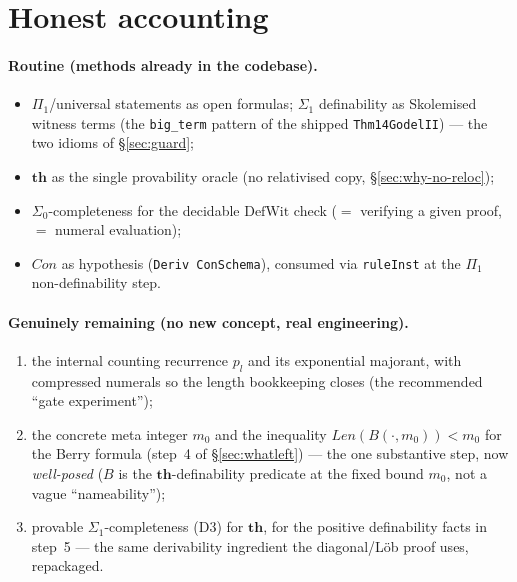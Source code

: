 \documentclass[11pt]{article}
\theoremstyle{plain}
\theoremstyle{definition}
\theoremstyle{remark}
\newcommand{\Con}{\mathit{Con}}
\newcommand{\Len}{\mathit{Len}}
\newcommand{\thmT}{\mathbf{th}}
\begin{document}
\section{Honest accounting}

\paragraph{Routine (methods already in the codebase).}
\begin{itemize}
\item $\Pi_1$/universal statements as open formulas; $\Sigma_1$
  definability as Skolemised witness terms (the \texttt{big\_term}
  pattern of the shipped \texttt{Thm14GodelII}) --- the two idioms of
  {\S}\ref{sec:guard};
\item $\thmT$ as the single provability oracle (no relativised copy,
  {\S}\ref{sec:why-no-reloc});
\item $\Sigma_0$-completeness for the decidable $\mathrm{DefWit}$ check
  ($=$ verifying a given proof, $=$ numeral evaluation);
\item $\Con$ as hypothesis (\texttt{Deriv ConSchema}), consumed via
  \texttt{ruleInst} at the $\Pi_1$ non-definability step.
\end{itemize}

\paragraph{Genuinely remaining (no new concept, real engineering).}
\begin{enumerate}
\item the internal counting recurrence $p_l$ and its exponential
  majorant, with compressed numerals so the length bookkeeping closes
  (the recommended ``gate experiment'');
\item the concrete meta integer $m_0$ and the inequality
  $\Len(B(\cdot,m_0))<m_0$ for the Berry formula (step~4 of
  {\S}\ref{sec:whatleft}) --- the one substantive step, now
  \emph{well-posed} ($B$ is the $\thmT$-definability predicate at the
  fixed bound $m_0$, not a vague ``nameability'');
\item provable $\Sigma_1$-completeness (D3) for $\thmT$, for the positive
  definability facts in step~5 --- the same derivability ingredient the
  diagonal/L\"ob proof uses, repackaged.
\end{enumerate}
\end{document}
